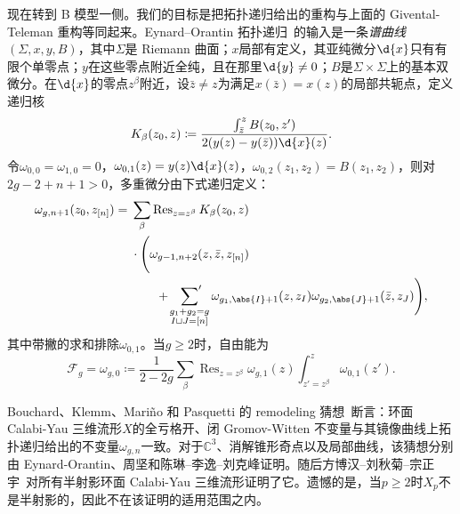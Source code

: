 \documentclass{amsart}
\theoremstyle{definition}
\theoremstyle{remark}
\theoremstyle{plain}
\theoremstyle{definition}
\theoremstyle{remark}
\newcommand{\C}{\mathbb{C}}
\newcommand{\mc}[1]{\mathcal{#1}}
\newcommand{\on}[1]{\operatorname{#1}}
\newcommand{\1}{\mathbf{1}}
\newcommand{\2}{\mathbf{2}}
\newcommand{\3}{\mathbf{3}}
\begin{document}
现在转到 B 模型一侧。我们的目标是把拓扑递归给出的重构与上面的 Givental-Teleman 重构等同起来。Eynard--Orantin 拓扑递归~\cite{EO2007}的输入是一条\textit{谱曲线}\((\Sigma,x,y,B)\)，其中\(\Sigma\)是 Riemann 曲面；\(x\)局部有定义，其亚纯微分\(\d{x}\)只有有限个单零点；\(y\)在这些零点附近全纯，且在那里\(\d{y} \neq 0\)；\(B\)是\(\Sigma \times \Sigma\)上的基本双微分。在\(\d{x}\)的零点\(z^{\beta}\)附近，设\(\bar{z} \neq z\)为满足\(x(\bar{z}) = x(z)\)的局部共轭点，定义递归核
\[ K_{\beta}(z_0,z) \coloneqq \frac{\int_{\bar{z}}^z B(z_0,z')}{2(y(z)-y(\bar{z}))\d{x}(z)}. \]
令\(\omega_{0,0} = \omega_{1,0} = 0\)，\(\omega_{0,1}(z) = y(z)\d{x}(z)\)，\(\omega_{0,2}(z_1,z_2) = B(z_1,z_2)\)，则对\(2g-2+n+1 > 0\)，多重微分由下式递归定义：
\begin{align*}
    \omega_{g,n+1}(z_0,z_{[n]}) ={}& \sum_{\beta}\on{Res}_{z = z^{\beta}} K_{\beta}(z_0,z) \\
    &\cdot \Bigg( \omega_{g-1,n+2}(z,\bar{z},z_{[n]}) \\
    &\qquad + \sideset{}{'}\sum_{\substack{g_1+g_2 = g \\ I \sqcup J = [n]}}\omega_{g_1,\abs{I}+1}(z,z_I)\omega_{g_2,\abs{J}+1}(\bar{z},z_J)\Bigg),
\end{align*}
其中带撇的求和排除\(\omega_{0,1}\)。当\(g \geq 2\)时，自由能为
\[ \mc{F}_g = \omega_{g,0} \coloneqq \frac{1}{2-2g}\sum_{\beta}\on{Res}_{z=z^{\beta}}\omega_{g,1}(z)\int_{z'=z^{\beta}}^z \omega_{0,1}(z'). \]

Bouchard、Klemm、Mari\~{n}o 和 Pasquetti 的 remodeling 猜想~\cite{BKMP2009}断言：环面 Calabi-Yau 三维流形\(X\)的全亏格开、闭 Gromov-Witten 不变量与其镜像曲线上拓扑递归给出的不变量\(\omega_{g,n}\)一致。对于\(\C^3\)、消解锥形奇点以及局部曲线，该猜想分别由 Eynard-Orantin、周坚和陈琳--李逸--刘克峰证明。随后方博汉--刘秋菊--宗正宇~\cite{FLZ2020}对所有半射影环面 Calabi-Yau 三维流形证明了它。遗憾的是，当\(p \geq 2\)时\(X_p\)不是半射影的，因此不在该证明的适用范围之内。
\end{document}
